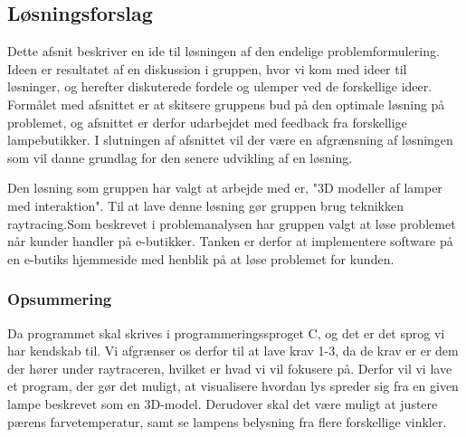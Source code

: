\subsection{Løsningsforslag}
\label{sec:losning}
Dette afsnit beskriver en ide til løsningen af den endelige problemformulering. Ideen er resultatet af en diskussion i gruppen, hvor vi kom med ideer til løsninger, og herefter diskuterede fordele og ulemper ved de forskellige ideer. Formålet med afsnittet er at skitsere gruppens bud på den optimale løsning på problemet, og afsnittet er derfor udarbejdet med feedback fra forskellige lampebutikker. I slutningen af afsnittet vil der være en afgrænsning af løsningen som vil danne grundlag for den senere udvikling af en løsning.

Den løsning som gruppen har valgt at arbejde med er, "3D modeller af lamper med interaktion". Til at lave denne løsning gør gruppen brug teknikken raytracing.\newline Som beskrevet i problemanalysen har gruppen valgt at løse problemet når kunder handler på e-butikker. Tanken er derfor at implementere software på en e-butiks hjemmeside med henblik på at løse problemet for kunden.





\subsubsection*{Opsummering}

Da programmet skal skrives i programmeringssproget C, og det er det sprog vi har kendskab til. Vi afgrænser os derfor til at lave krav 1-3, da de krav er er dem der hører under raytraceren, hvilket er hvad vi vil fokusere på. Derfor vil vi lave et program, der gør det muligt, at visualisere hvordan lys spreder sig fra en given lampe beskrevet som en 3D-model. Derudover skal det være muligt at justere pærens farvetemperatur, samt se lampens belysning fra flere forskellige vinkler. 